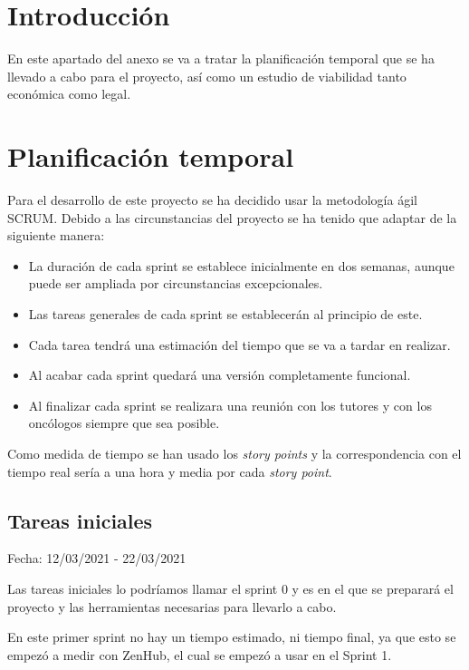 
\section{Introducción}

En este apartado del anexo se va a tratar la planificación temporal que se ha llevado a cabo para el proyecto, así como un estudio de viabilidad tanto económica como legal.

\section{Planificación temporal}

Para el desarrollo de este proyecto se ha decidido usar la metodología ágil SCRUM. Debido a las circunstancias del proyecto se ha tenido que adaptar de la siguiente manera: 

\begin{itemize}
    \item La duración de cada sprint se establece inicialmente en dos semanas, aunque puede ser ampliada por circunstancias excepcionales.
    \item Las tareas generales de cada sprint se establecerán al principio de este.
    \item Cada tarea tendrá una estimación del tiempo que se va a tardar en realizar.
    \item Al acabar cada sprint quedará una versión completamente funcional.
    \item Al finalizar cada sprint se realizara una reunión con los tutores y con los oncólogos siempre que sea posible.
\end{itemize}

Como medida de tiempo se han usado los \textit{story points} y la correspondencia con el tiempo real sería a una hora y media por cada \textit{story point}.

\subsection{Tareas iniciales}

Fecha: 12/03/2021 - 22/03/2021

Las tareas iniciales lo podríamos llamar el sprint 0 y es en el que se preparará el proyecto y las herramientas necesarias para llevarlo a cabo.

En este primer sprint no hay un tiempo estimado, ni tiempo final, ya que esto se empezó a medir con ZenHub, el cual se empezó a usar en el Sprint 1.

